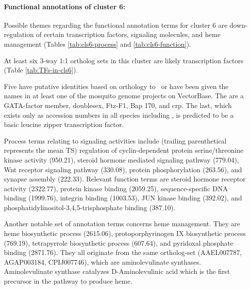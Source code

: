 \paragraph*{Functional annotations of cluster 6:}





Possible themes regarding the functional annotation terms for cluster 6 are down-regulation of certain transcription factors, signaling molecules, and heme management (Tables \ref{tab:cls6-process} and \ref{tab:cls6-function}).




At least six 3-way 1:1 ortholog sets in this cluster are likely transcription factors (Table \ref{tab:TFs-in-cls6}).

%
Five have putative identities based on orthology to \Dm\ or have been given the names in at least one of the mosquito genome projects on VectorBase.
%
The are a GATA-factor member, doublesex, Ftz-F1, Bap 170, and crp.
%
The last, which exists only as accession numbers in all species including \Dm, is predicted to be a basic leucine zipper transcription factor.

Process terms relating to signaling activities include (trailing parenthetical represents the mean \gls{TS}) regulation of cyclin-dependent protein serine/threonine kinase activity (950.21), steroid hormone mediated signaling pathway (779.04), Wnt receptor signaling pathway (330.08), protein phosphorylation (263.56), and synapse assembly (222.33).
%
Relevant function terms are steroid hormone receptor activity (2322.77), protein kinase binding (2059.25), sequence-specific DNA binding (1999.76), integrin binding (1003.53), JUN kinase binding (392.02), and phosphatidylinositol-3,4,5-trisphosphate binding (387.10).

Another notable set of annotation terms concerns heme management.
%
They are heme biosynthetic process (2615.06), protoporphyrinogen IX biosynthetic process (769.19), tetrapyrrole biosynthetic process (607.64), and pyridoxal phosphate binding (2871.76).
%
They all originate from the same ortholog-set (AAEL007787, AGAP003184, CPIJ007746), which are aminolevulinate synthases.
%
Aminolevulinate synthase catalyzes D-Aminolevulinic acid which is the first precursor in the pathway to produce heme.








